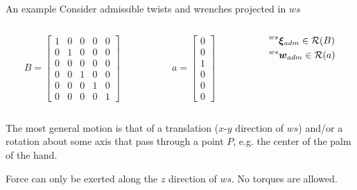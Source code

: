\begin{frame}{An example}
  Consider admissible twists and wrenches projected in $ws$
  \begin{columns}
    \begin{column}{0.4\columnwidth}
      \[
      B=
      \begin {bmatrix}
        1 & 0 & 0 & 0 & 0\\
        0 & 1 & 0 & 0 & 0\\
        0 & 0 & 0 & 0 & 0\\
        0 & 0 & 1 & 0 & 0\\
        0 & 0 & 0 & 1 & 0\\
        0 & 0 & 0 & 0 & 1
      \end {bmatrix}
      \]
    \end{column}
    \begin{column}{0.2\columnwidth}
      \[
      a=
      \begin {bmatrix}
        0 \\
        0 \\
        1 \\
        0 \\
        0 \\
        0 
      \end {bmatrix}
      \]
    \end{column}
    \begin{column}{0.4\columnwidth}
      \[
      \begin{split}
        & \prescript{ws}{}{\boldsymbol{\xi}}_{adm} \in \mathcal{R}(B)\\
        & \prescript{ws}{}{\vec{w}}_{adm} \in \mathcal{R}(a)
      \end{split}
      \]
    \end{column}
  \end{columns}

  The most general motion is that of a translation ($x$-$y$ direction of $ws$)
  and/or a rotation about some axis that pass through a point $P$, e.g. the center of the 
  palm of the hand.
  \par
  Force can only be exerted along the $z$ direction of $ws$. No torques are allowed.
  \end{frame}

